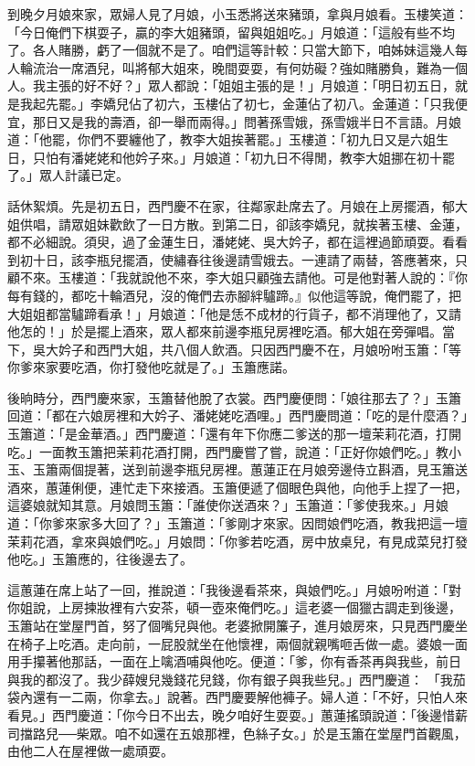 到晚夕月娘來家，眾婦人見了月娘，小玉悉將送來豬頭，拿與月娘看。玉樓笑道：「今日俺們下棋耍子，贏的李大姐豬頭，留與姐姐吃。」月娘道：「這般有些不均了。各人賭勝，虧了一個就不是了。咱們這等計較：只當大節下，咱姊妹這幾人每人輪流治一席酒兒，叫將郁大姐來，晚間耍耍，有何妨礙？強如賭勝負，難為一個人。我主張的好不好？」眾人都說：「姐姐主張的是！」月娘道：「明日初五日，就是我起先罷。」李嬌兒佔了初六，玉樓佔了初七，金蓮佔了初八。金蓮道：「只我便宜，那日又是我的壽酒，卻一舉而兩得。」問著孫雪娥，孫雪娥半日不言語。月娘道：「他罷，你們不要纏他了，教李大姐挨著罷。」玉樓道：「初九日又是六姐生日，只怕有潘姥姥和他妗子來。」月娘道：「初九日不得閒，教李大姐挪在初十罷了。」眾人計議已定。

話休絮煩。先是初五日，西門慶不在家，往鄰家赴席去了。月娘在上房擺酒，郁大姐供唱，請眾姐妹歡飲了一日方散。到第二日，卻該李嬌兒，就挨著玉樓、金蓮，都不必細說。須臾，過了金蓮生日，潘姥姥、吳大妗子，都在這裡過節頑耍。看看到初十日，該李瓶兒擺酒，使繡春往後邊請雪娥去。一連請了兩替，答應著來，只顧不來。玉樓道：「我就說他不來，李大姐只顧強去請他。可是他對著人說的：『你每有錢的，都吃十輪酒兒，沒的俺們去赤腳絆驢蹄。』似他這等說，俺們罷了，把大姐姐都當驢蹄看承！」月娘道：「他是恁不成材的行貨子，都不消理他了，又請他怎的！」於是擺上酒來，眾人都來前邊李瓶兒房裡吃酒。郁大姐在旁彈唱。當下，吳大妗子和西門大姐，共八個人飲酒。只因西門慶不在，月娘吩咐玉簫：「等你爹來家要吃酒，你打發他吃就是了。」玉簫應諾。

後晌時分，西門慶來家，玉簫替他脫了衣裳。西門慶便問：「娘往那去了？」玉簫回道：「都在六娘房裡和大妗子、潘姥姥吃酒哩。」西門慶問道：「吃的是什麼酒？」玉簫道：「是金華酒。」西門慶道：「還有年下你應二爹送的那一壇茉莉花酒，打開吃。」一面教玉簫把茉莉花酒打開，西門慶嘗了嘗，說道：「正好你娘們吃。」教小玉、玉簫兩個提著，送到前邊李瓶兒房裡。蕙蓮正在月娘旁邊侍立斟酒，見玉簫送酒來，蕙蓮俐便，連忙走下來接酒。玉簫便遞了個眼色與他，向他手上捏了一把，這婆娘就知其意。月娘問玉簫：「誰使你送酒來？」玉簫道：「爹使我來。」月娘道：「你爹來家多大回了？」玉簫道：「爹剛才來家。因問娘們吃酒，教我把這一壇茉莉花酒，拿來與娘們吃。」月娘問：「你爹若吃酒，房中放桌兒，有見成菜兒打發他吃。」玉簫應的，往後邊去了。

這蕙蓮在席上站了一回，推說道：「我後邊看茶來，與娘們吃。」月娘吩咐道：「對你姐說，上房揀妝裡有六安茶，頓一壺來俺們吃。」這老婆一個獵古調走到後邊，玉簫站在堂屋門首，努了個嘴兒與他。老婆掀開簾子，進月娘房來，只見西門慶坐在椅子上吃酒。走向前，一屁股就坐在他懷裡，兩個就親嘴咂舌做一處。婆娘一面用手攥著他那話，一面在上噙酒哺與他吃。便道：「爹，你有香茶再與我些，前日與我的都沒了。我少薛嫂兒幾錢花兒錢，你有銀子與我些兒。」西門慶道： 「我茄袋內還有一二兩，你拿去。」說著。西門慶要解他褲子。婦人道：「不好，只怕人來看見。」西門慶道：「你今日不出去，晚夕咱好生耍耍。」蕙蓮搖頭說道：「後邊惜薪司擋路兒──柴眾。咱不如還在五娘那裡，色絲子女。」於是玉簫在堂屋門首觀風，由他二人在屋裡做一處頑耍。

